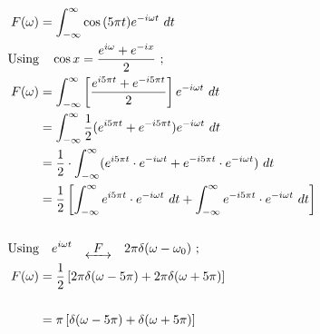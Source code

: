 \documentclass[preview]{standalone}
\begin{document}
\begin{align*}
F(\omega)&=\int_{-\infty}^{\infty} \cos{(5\pi t)} e^{-i\omega t} \ dt \\ \textrm{Using}& \quad \cos{x}=\frac{e^{i\omega}+e^{-ix}}{2} \ ; \\ F(\omega)&=\int_{-\infty}^{\infty}\left[ \frac{e^{i5\pi t}+e^{-i5\pi t}}{2}\right] e^{-i\omega t} \ dt \\ &=\int_{-\infty}^{\infty} \frac{1}{2} (e^{i5\pi t}+e^{-i5\pi t})e^{-i\omega t} \ dt \\ &=\frac{1}{2}\cdot \int_{-\infty}^{\infty}(e^{i5\pi t}\cdot e^{-i\omega t}+e^{-i5\pi t}\cdot e^{-i\omega t}) \ dt \\ &=\frac{1}{2}\left[ \int_{-\infty}^{\infty}e^{i5\pi t}\cdot e^{-i\omega t} \ dt+\int_{-\infty}^{\infty} e^{-i5\pi t}\cdot e^{-i\omega t} \ dt \right] \\ \\ \textrm{Using}& \quad e^{i\omega t} \quad \underleftrightarrow{ \ \ F \ \ } \quad 2\pi \delta(\omega - \omega_{0}) \ ; \\ F(\omega)&=\frac{1}{2}\left[ 2\pi \delta(\omega-5\pi)+2\pi\delta(\omega+5\pi) \right] \\ \\ &=\pi\left[\delta(\omega-5\pi)+\delta(\omega+5\pi)\right]
\end{align*}
\end{document}
